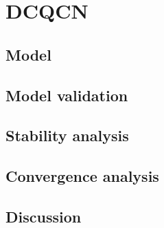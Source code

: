 \section{DCQCN}

\subsection{Model}

\subsection{Model validation}

\subsection{Stability analysis}

\subsection{Convergence analysis}

\subsection{Discussion}

